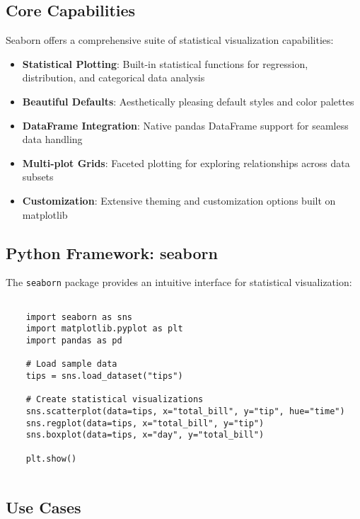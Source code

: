 \subsection{Core Capabilities}
\label{subsec:capabilities}

Seaborn offers a comprehensive suite of statistical visualization capabilities:

\begin{itemize}
	\item \textbf{Statistical Plotting}: Built-in statistical functions for regression, distribution, and categorical data analysis
	\item \textbf{Beautiful Defaults}: Aesthetically pleasing default styles and color palettes
	\item \textbf{DataFrame Integration}: Native pandas DataFrame support for seamless data handling
	\item \textbf{Multi-plot Grids}: Faceted plotting for exploring relationships across data subsets
	\item \textbf{Customization}: Extensive theming and customization options built on matplotlib
\end{itemize}

\clearpage

\subsection{Python Framework: seaborn}
\label{subsec:seaborn}

The \texttt{seaborn} package provides an intuitive interface for statistical visualization:

\begin{lstlisting}[language=MyPython, caption={Seaborn Core Functions}, label={lst:seaborn_core}]
	
	import seaborn as sns
	import matplotlib.pyplot as plt
	import pandas as pd
	
	# Load sample data
	tips = sns.load_dataset("tips")
	
	# Create statistical visualizations
	sns.scatterplot(data=tips, x="total_bill", y="tip", hue="time")
	sns.regplot(data=tips, x="total_bill", y="tip")
	sns.boxplot(data=tips, x="day", y="total_bill")
	
	plt.show()
	
\end{lstlisting}

\subsection{Use Cases}
\label{subsec:usecases}

